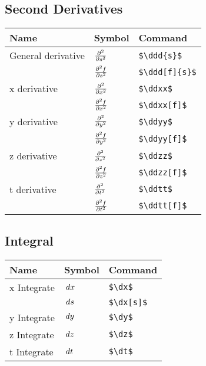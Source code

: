 \documentclass[10pt,letterpaper,oneside]{article}
\begin{document}
\subsection{Second Derivatives}
\begin{supertabular}{p{0.4\textwidth}|p{0.3\textwidth}|p{0.3\textwidth}}
  Name & Symbol & Command \\ \hline
  General derivative &  $\ddd{s}$  &  \lstinline|$\ddd{s}$| \\
   & $\ddd[f]{s}$  &  \lstinline|$\ddd[f]{s}$|\\
  x derivative &  $\ddxx$  &  \lstinline|$\ddxx$| \\
   & $\ddxx[f]$  &  \lstinline|$\ddxx[f]$|\\
  y derivative &  $\ddyy$  &  \lstinline|$\ddyy$| \\
   & $\ddyy[f]$  &  \lstinline|$\ddyy[f]$|\\
  z derivative &  $\ddzz$  &  \lstinline|$\ddzz$| \\
   & $\ddzz[f]$  &  \lstinline|$\ddzz[f]$|\\
  t derivative &  $\ddtt$  &  \lstinline|$\ddtt$| \\
   & $\ddtt[f]$  &  \lstinline|$\ddtt[f]$|\\
\end{supertabular}

\subsection{Integral}
\begin{supertabular}{p{0.4\textwidth}|p{0.3\textwidth}|p{0.3\textwidth}}
  Name & Symbol & Command \\ \hline
  x Integrate &  $\dx$  &  \lstinline|$\dx$| \\
   & $\dx[s]$  &  \lstinline|$\dx[s]$|\\
  y Integrate &  $\dy$  &  \lstinline|$\dy$|\\
  z Integrate &  $\dz$  &  \lstinline|$\dz$|\\
  t Integrate &  $\dt$  &  \lstinline|$\dt$|\\
\end{supertabular}
\end{document}
